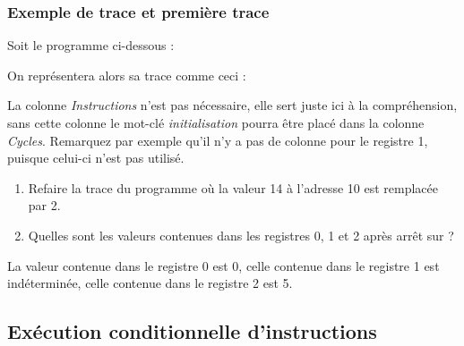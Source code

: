 \subsubsection{Exemple de trace et première trace}


\begin{minipage}[t]{0.35\linewidth}
Soit le programme ci-dessous :

\end{minipage}\hfill
\begin{minipage}[t]{0.6\linewidth}
On représentera alors sa trace comme ceci : 
\bigskip


\end{minipage}
\medskip

La colonne \emph{Instructions} n'est pas nécessaire, elle sert juste ici à la compréhension, sans cette colonne le mot-clé \emph{initialisation} pourra être placé dans la colonne \emph{Cycles}. Remarquez par exemple qu'il n'y a pas de colonne pour le registre 1, puisque celui-ci n'est pas utilisé.


\begin{enumerate}
\item Refaire la trace du programme où la valeur 14 à l'adresse 10 est remplacée
  par 2.

\item  Quelles sont les valeurs contenues dans les registres 0, 1 et 2
  après arrêt sur  ?
\end{enumerate}
\begin{correction}

La valeur contenue dans le registre 0 est 0, celle contenue dans le registre 1 est indéterminée, celle contenue dans le registre 2 est 5.



\end{correction}

\subsection{Exécution conditionnelle d'instructions}

